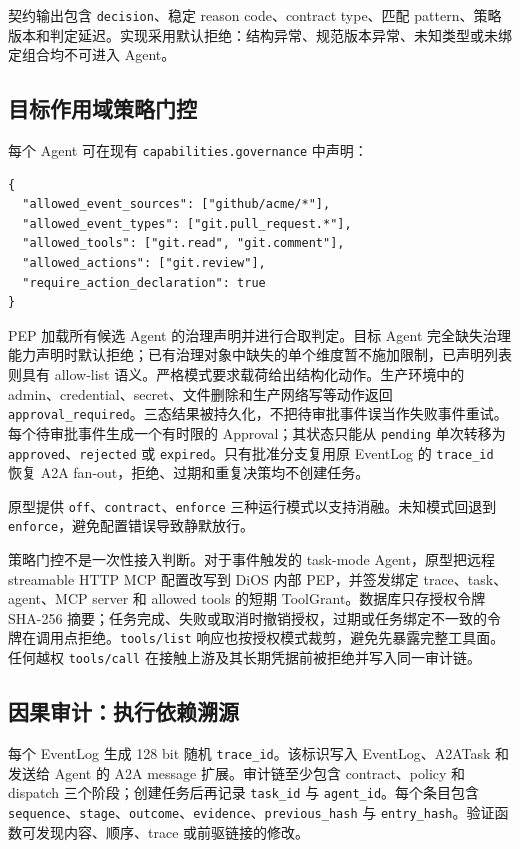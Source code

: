 契约输出包含 \texttt{decision}、稳定 reason code、contract type、匹配 pattern、策略版本和判定延迟。实现采用默认拒绝：结构异常、规范版本异常、未知类型或未绑定组合均不可进入 Agent。

\subsection{目标作用域策略门控}\label{43-ux76eeux6807ux4f5cux7528ux57dfux7b56ux7565ux95e8ux63a7}

每个 Agent 可在现有 \texttt{capabilities.governance} 中声明：

\begin{verbatim}
{
  "allowed_event_sources": ["github/acme/*"],
  "allowed_event_types": ["git.pull_request.*"],
  "allowed_tools": ["git.read", "git.comment"],
  "allowed_actions": ["git.review"],
  "require_action_declaration": true
}
\end{verbatim}

PEP 加载所有候选 Agent 的治理声明并进行合取判定。目标 Agent 完全缺失治理能力声明时默认拒绝；已有治理对象中缺失的单个维度暂不施加限制，已声明列表则具有 allow-list 语义。严格模式要求载荷给出结构化动作。生产环境中的 admin、credential、secret、文件删除和生产网络写等动作返回 \texttt{approval\_required}。三态结果被持久化，不把待审批事件误当作失败事件重试。每个待审批事件生成一个有时限的 Approval；其状态只能从 \texttt{pending} 单次转移为 \texttt{approved}、\texttt{rejected} 或 \texttt{expired}。只有批准分支复用原 EventLog 的 \texttt{trace\_id} 恢复 A2A fan-out，拒绝、过期和重复决策均不创建任务。

原型提供 \texttt{off}、\texttt{contract}、\texttt{enforce} 三种运行模式以支持消融。未知模式回退到 \texttt{enforce}，避免配置错误导致静默放行。

策略门控不是一次性接入判断。对于事件触发的 task-mode Agent，原型把远程 streamable HTTP MCP 配置改写到 DiOS 内部 PEP，并签发绑定 trace、task、agent、MCP server 和 allowed tools 的短期 ToolGrant。数据库只存授权令牌 SHA-256 摘要；任务完成、失败或取消时撤销授权，过期或任务绑定不一致的令牌在调用点拒绝。\texttt{tools/list} 响应也按授权模式裁剪，避免先暴露完整工具面。任何越权 \texttt{tools/call} 在接触上游及其长期凭据前被拒绝并写入同一审计链。

\subsection{因果审计：执行依赖溯源}\label{44-ux56e0ux679cux5ba1ux8ba1}

每个 EventLog 生成 128 bit 随机 \texttt{trace\_id}。该标识写入 EventLog、A2ATask 和发送给 Agent 的 A2A message 扩展。审计链至少包含 contract、policy 和 dispatch 三个阶段；创建任务后再记录 \texttt{task\_id} 与 \texttt{agent\_id}。每个条目包含 \texttt{sequence}、\texttt{stage}、\texttt{outcome}、\texttt{evidence}、\texttt{previous\_hash} 与 \texttt{entry\_hash}。验证函数可发现内容、顺序、trace 或前驱链接的修改。

